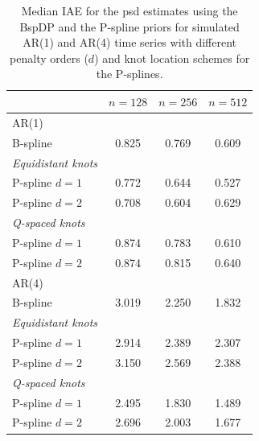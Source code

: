 \documentclass[twocolumn,final]{svjour3}
\begin{document}
\def\arraystretch{1.1}
\begin{table}
	\centering
		\begin{tabular}{lccc}
			\toprule
			& $n=128$ & $n=256$ & $n=512$ \\ \hline
			AR(1)     &  &  &  \\ 
			B-spline &  0.825 & 0.769 & 0.609  \\
			\textit{Equidistant knots}& & &   \\
			\hspace{0.5em}P-spline $d=1$ &  0.772 & 0.644 & 0.527 \\
			\hspace{0.5em}P-spline $d=2$&  0.708 & 0.604 & 0.629 \\
			\textit{Q-spaced knots}& & &   \\
			\hspace{0.5em}P-spline $d=1$ & 0.874 & 0.783 & 0.610 \\
			\hspace{0.5em}P-spline $d=2$ & 0.874 & 0.815 & 0.640 \\ \hline
			AR(4)     &  &  &  \\ 
			B-spline & 3.019 & 2.250 & 1.832   \\
			\textit{Equidistant knots}& & &   \\
			\hspace{0.5em}P-spline $d=1$ &  2.914 & 2.389 & 2.307\\
			\hspace{0.5em}P-spline $d=2$&  3.150 & 2.569 & 2.388\\
			\textit{Q-spaced knots}& & &   \\
			\hspace{0.5em}P-spline $d=1$ & 2.495 & 1.830 & 1.489\\
			\hspace{0.5em}P-spline $d=2$ &  2.696 & 2.003 & 1.677\\
			\bottomrule
		\end{tabular}
	\caption{Median IAE for the psd estimates using the BspDP and the P-spline priors for simulated AR(1) and AR(4) time series with  different penalty orders ($d$) and knot location schemes for the P-splines.}
	\label{table:sim_IAE}
\end{table}
\end{document}
